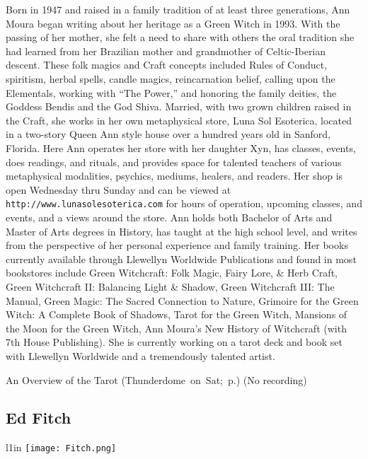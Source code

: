{ Born in 1947 and raised in a family tradition of at least three generations, Ann Moura began writing about her heritage as a Green Witch in 1993. With the passing of her mother, she felt a need to share with others the oral tradition she had learned from her Brazilian mother and grandmother of Celtic-Iberian descent. These folk magics and Craft concepts included Rules of Conduct, spiritism, herbal spells, candle magics, reincarnation belief, calling upon the Elementals, working with  ``The Power,''  and honoring the family deities, the Goddess Bendis and the God Shiva.
Married, with two grown children raised in the Craft, she works in her own metaphysical store, Luna Sol Esoterica, located in a two-story Queen Ann style house over a hundred years old in Sanford, Florida. Here Ann operates her store with her daughter Xyn, has classes, events, does readings, and rituals, and provides space for talented teachers of various metaphysical modalities, psychics, mediums, healers, and readers. Her shop is open Wednesday thru Sunday and can be viewed at \texttt{http://www.lunasolesoterica.com} for hours of operation, upcoming classes, and events, and a views around the store.
Ann holds both Bachelor of Arts and Master of Arts degrees in History, has taught at the high school level, and writes from the perspective of her personal experience and family training.
Her books currently available through Llewellyn Worldwide Publications and found in most bookstores include Green Witchcraft: Folk Magic, Fairy Lore, \& Herb Craft, Green Witchcraft II: Balancing Light \& Shadow, Green Witchcraft III: The Manual, Green Magic: The Sacred Connection to Nature, Grimoire for the Green Witch: A Complete Book of Shadows, Tarot for the Green Witch, Mansions of the Moon for the Green Witch, Ann Moura's New History of Witchcraft (with 7th House Publishing).
She is currently working on a tarot deck and book set with Llewellyn Worldwide and a tremendously talented artist. 

} \hspace{2em} {\footnotesize An Overview of the Tarot (Thunderdome~on~Sat;~p.\pageref{Sat-Moura1})}
 {\small (No recording)} 


\endgroup

\vspace{6pt}
\subsection{Ed Fitch} 

\begingroup
 \begin{wrapfigure}{l}{1in}
  \texttt{[image: Fitch.png]} %
  \end{wrapfigure}

